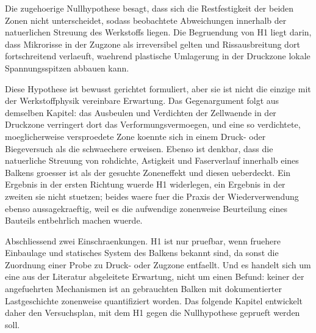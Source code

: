 Die zugehoerige Nullhypothese besagt, dass sich die Restfestigkeit der beiden
Zonen nicht unterscheidet, sodass beobachtete Abweichungen innerhalb der
natuerlichen Streuung des Werkstoffs liegen. Die Begruendung von H1 liegt darin,
dass Mikrorisse in der Zugzone als irreversibel gelten und Rissausbreitung dort
fortschreitend verlaeuft, waehrend plastische Umlagerung in der Druckzone
lokale Spannungsspitzen abbauen kann.

Diese Hypothese ist bewusst gerichtet formuliert, aber sie ist nicht die
einzige mit der Werkstoffphysik vereinbare Erwartung. Das Gegenargument folgt
aus demselben Kapitel: das Ausbeulen und Verdichten der Zellwaende in der
Druckzone verringert dort das Verformungsvermoegen, und eine so verdichtete,
moeglicherweise versproedete Zone koennte sich in einem Druck- oder
Biegeversuch als die schwaechere erweisen. Ebenso ist denkbar, dass die
natuerliche Streuung von \gls{rohdichte}, Astigkeit und Faserverlauf innerhalb
eines Balkens groesser ist als der gesuchte Zoneneffekt und diesen
ueberdeckt. Ein Ergebnis in der ersten Richtung wuerde H1 widerlegen, ein
Ergebnis in der zweiten sie nicht stuetzen; beides waere fuer die Praxis der
Wiederverwendung ebenso aussagekraeftig, weil es die aufwendige zonenweise
Beurteilung eines Bauteils entbehrlich machen wuerde.

Abschliessend zwei Einschraenkungen. H1 ist nur pruefbar, wenn fruehere
Einbaulage und statisches System des Balkens bekannt sind, da sonst die
Zuordnung einer Probe zu Druck- oder Zugzone entfaellt. Und es handelt sich um
eine aus der Literatur abgeleitete Erwartung, nicht um einen Befund: keiner der
angefuehrten Mechanismen ist an gebrauchten Balken mit dokumentierter
Lastgeschichte zonenweise quantifiziert worden. Das folgende Kapitel entwickelt
daher den Versuchsplan, mit dem H1 gegen die Nullhypothese geprueft werden soll.

